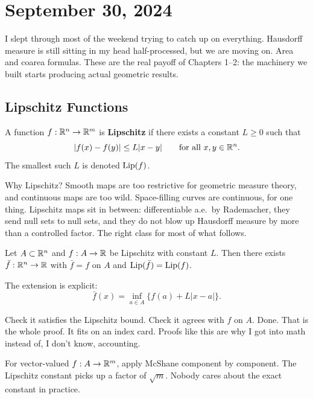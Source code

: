 
\section{September 30, 2024}

I slept through most of the weekend trying to catch up on everything. Hausdorff measure is still sitting in my head half-processed, but we are moving on. Area and coarea formulas. These are the real payoff of Chapters 1--2: the machinery we built starts producing actual geometric results.

\subsection{Lipschitz Functions}
\label{def:lipschitz}

\begin{definition}
\label{def:lip}
A function $f : \mathbb{R}^n \to \mathbb{R}^m$ is \textbf{Lipschitz} if there exists a constant $L \geq 0$ such that
\[
  |f(x) - f(y)| \leq L|x - y| \qquad \text{for all } x, y \in \mathbb{R}^n.
\]
The smallest such $L$ is denoted $\operatorname{Lip}(f)$.
\end{definition}

Why Lipschitz? Smooth maps are too restrictive for geometric measure theory, and continuous maps are too wild. Space-filling curves are continuous, for one thing. Lipschitz maps sit in between: differentiable a.e.\ by Rademacher, they send null sets to null sets, and they do not blow up Hausdorff measure by more than a controlled factor. The right class for most of what follows.

\begin{theorem}
\label{thm:mcshane}
Let $A \subset \mathbb{R}^n$ and $f : A \to \mathbb{R}$ be Lipschitz with constant $L$. Then there exists $\bar{f} : \mathbb{R}^n \to \mathbb{R}$ with $\bar{f} = f$ on $A$ and $\operatorname{Lip}(\bar{f}) = \operatorname{Lip}(f)$.
\end{theorem}

The extension is explicit:
\[
  \bar{f}(x) = \inf_{a \in A} \bigl\{ f(a) + L|x - a| \bigr\}.
\]

Check it satisfies the Lipschitz bound. Check it agrees with $f$ on $A$. Done. That is the whole proof. It fits on an index card. Proofs like this are why I got into math instead of, I don't know, accounting.

For vector-valued $f : A \to \mathbb{R}^m$, apply McShane component by component. The Lipschitz constant picks up a factor of $\sqrt{m}$. Nobody cares about the exact constant in practice.


